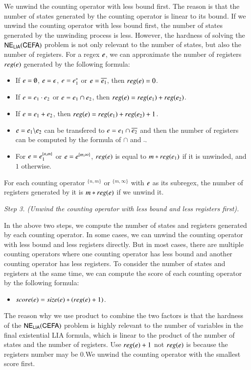 {We unwind the counting operator with less bound first. The reason is that the number of states generated by the counting operator is linear to its bound. If we unwind the counting operator with less bound first, the number of states generated by the unwinding process is less. However, the hardness of solving the ${\sf NE_{LIA}(CEFA)}$ problem is not only relevant to the number of states, but also the number of registers. For a regex $e$, we can approximate the number of registers $reg(e)$ generated by the following formula:
\begin{itemize}
  \item If $e = \emptyset$, $e = \epsilon$, $e = e_1^*$ or $e = \overline{e_1}$, then $reg(e) = 0$.
  \item If $e = e_1\cdot e_2$ or $e = e_1 \cap e_2$, then $reg(e) = reg(e_1) + reg(e_2)$.
  \item If $e = e_1 + e_2$, then $reg(e) = reg(e_1) + reg(e_2) + 1$.
  \item $e = e_1 \backslash e_2$ can be transfered to $e = e_1 \cap \overline{e_2}$ and then the number of registers can be computed by the formula of $\cap$ and $\bar{}$.
  \item For $e = e_1^{\{n,m\}}$ or $e = e^{\{m, \infty\}}$, $reg(e)$ is equal to $m*reg(e_1)$ if it is unwinded, and $1$ otherwise.
\end{itemize}

For each counting operator $^{\{n,m\}}$ or $^{\{m,\infty\}}$ with $e$ as its subregex, the number of registers generated by it is $m*reg(e)$ if we unwind it.

\medskip
\noindent
\emph{Step 3. (Unwind the counting operator with less bound and less registers first).}

In the above two steps, we compute the number of states and registers generated by each counting operator. In some cases, we can unwind the counting operator with less bound and less registers directly. But in most cases, there are multiple counting operators where one counting operator has less bound and another counting operator has less registers. To consider the number of states and registers at the same time, we can compute the score of each counting operator by the following formula:
\begin{itemize}
  \item $score(e) = size(e) * (reg(e)+1)$.
\end{itemize} 
The reason why we use product to combine the two factors is that the hardness of the ${\sf NE_{LIA}(CEFA)}$ problem is highly relevant to the number of variables in the final existential LIA formula, which is linear to the product of the number of states and the number of registers. Use $reg(e) + 1$ not $reg(e)$ is because the registers number may be $0$.We unwind the counting operator with the smallest score first. 

}
